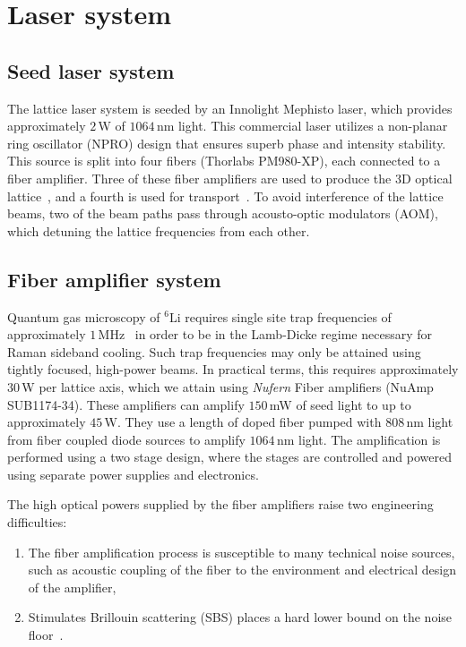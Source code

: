 \documentclass[twocolumn,aps,pra,showpacs,preprintnumbers,bibnotes]{revtex4-1}
\newcommand\Isotope[2]{\ensuremath{^{#1}\mathrm{#2}}}
\newcommand\Li{\Isotope{6}{Li}}
\begin{document}
\section{Laser system}
\subsection{Seed laser system}
The lattice laser system is seeded by an Innolight Mephisto laser, which provides approximately $2\,$W of $1064\,$nm light. 
This commercial laser utilizes a non-planar ring oscillator (NPRO) design that ensures superb phase and intensity stability. 
This source is split into four fibers (Thorlabs PM980-XP), each connected to a fiber amplifier. 
Three of these fiber amplifiers are used to produce the 3D optical lattice~\cite{Parsons2016}, and a fourth is used for transport~\cite{Huber2014}.
To avoid interference of the lattice beams, two of the beam paths pass through acousto-optic modulators (AOM), which detuning the lattice frequencies from each other. 

\subsection{Fiber amplifier system}
Quantum gas microscopy of \Li{} requires single site trap frequencies of approximately $1\,$MHz~\cite{Parsons2015} in order to be in the Lamb-Dicke regime necessary for Raman sideband cooling.
Such trap frequencies may only be attained using tightly focused, high-power beams. 
In practical terms, this requires approximately $30\,$W per lattice axis, which we attain using \textit{Nufern} Fiber amplifiers (NuAmp SUB1174-34).
These amplifiers can amplify $150\,$mW of seed light to up to approximately $45\,$W. They use a length of doped fiber pumped with $808\,$nm light from fiber coupled diode sources to amplify $1064\,$nm light. 
The amplification is performed using a two stage design, where the stages are controlled and powered using separate power supplies and electronics.

The high optical powers supplied by the fiber amplifiers raise two engineering difficulties:
\begin{enumerate}
  \item The fiber amplification process is susceptible to many technical noise sources, such as acoustic coupling of the fiber to the environment and electrical design of the amplifier, 
  \item Stimulates Brillouin scattering (SBS) places a hard lower bound on the noise floor~\cite{Agrawal2013}. 
\end{enumerate}
\end{document}
